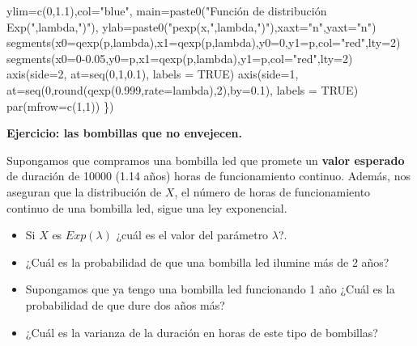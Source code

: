 \documentclass[
  letterpaper,
  DIV=11,
  numbers=noendperiod]{scrreprt}
\newenvironment{Shaded}{\begin{snugshade}}{\end{snugshade}}
\newcommand{\AttributeTok}[1]{\textcolor[rgb]{0.40,0.45,0.13}{#1}}
\newcommand{\ConstantTok}[1]{\textcolor[rgb]{0.56,0.35,0.01}{#1}}
\newcommand{\DecValTok}[1]{\textcolor[rgb]{0.68,0.00,0.00}{#1}}
\newcommand{\FloatTok}[1]{\textcolor[rgb]{0.68,0.00,0.00}{#1}}
\newcommand{\FunctionTok}[1]{\textcolor[rgb]{0.28,0.35,0.67}{#1}}
\newcommand{\NormalTok}[1]{\textcolor[rgb]{0.00,0.23,0.31}{#1}}
\newcommand{\StringTok}[1]{\textcolor[rgb]{0.13,0.47,0.30}{#1}}
\providecommand{\tightlist}{%
  \setlength{\itemsep}{0pt}\setlength{\parskip}{0pt}}\usepackage{longtable,booktabs,array}
\begin{document}
\begin{Shaded}
\begin{Highlighting}[]
        \AttributeTok{ylim=}\FunctionTok{c}\NormalTok{(}\DecValTok{0}\NormalTok{,}\FloatTok{1.1}\NormalTok{),}\AttributeTok{col=}\StringTok{"blue"}\NormalTok{,}
        \AttributeTok{main=}\FunctionTok{paste0}\NormalTok{(}\StringTok{"Función de distribución Exp("}\NormalTok{,lambda,}\StringTok{")"}\NormalTok{),}
        \AttributeTok{ylab=}\FunctionTok{paste0}\NormalTok{(}\StringTok{"pexp(x,"}\NormalTok{,lambda,}\StringTok{")"}\NormalTok{),}\AttributeTok{xaxt=}\StringTok{"n"}\NormalTok{,}\AttributeTok{yaxt=}\StringTok{"n"}\NormalTok{)}
  \FunctionTok{segments}\NormalTok{(}\AttributeTok{x0=}\FunctionTok{qexp}\NormalTok{(p,lambda),}\AttributeTok{x1=}\FunctionTok{qexp}\NormalTok{(p,lambda),}\AttributeTok{y0=}\DecValTok{0}\NormalTok{,}\AttributeTok{y1=}\NormalTok{p,}\AttributeTok{col=}\StringTok{"red"}\NormalTok{,}\AttributeTok{lty=}\DecValTok{2}\NormalTok{)}
  \FunctionTok{segments}\NormalTok{(}\AttributeTok{x0=}\DecValTok{0}\FloatTok{{-}0.05}\NormalTok{,}\AttributeTok{y0=}\NormalTok{p,}\AttributeTok{x1=}\FunctionTok{qexp}\NormalTok{(p,lambda),}\AttributeTok{y1=}\NormalTok{p,}\AttributeTok{col=}\StringTok{"red"}\NormalTok{,}\AttributeTok{lty=}\DecValTok{2}\NormalTok{)}
  \FunctionTok{axis}\NormalTok{(}\AttributeTok{side=}\DecValTok{2}\NormalTok{, }\AttributeTok{at=}\FunctionTok{seq}\NormalTok{(}\DecValTok{0}\NormalTok{,}\DecValTok{1}\NormalTok{,}\FloatTok{0.1}\NormalTok{), }\AttributeTok{labels =} \ConstantTok{TRUE}\NormalTok{)}
  \FunctionTok{axis}\NormalTok{(}\AttributeTok{side=}\DecValTok{1}\NormalTok{, }\AttributeTok{at=}\FunctionTok{seq}\NormalTok{(}\DecValTok{0}\NormalTok{,}\FunctionTok{round}\NormalTok{(}\FunctionTok{qexp}\NormalTok{(}\FloatTok{0.999}\NormalTok{,}\AttributeTok{rate=}\NormalTok{lambda),}\DecValTok{2}\NormalTok{),}\AttributeTok{by=}\FloatTok{0.1}\NormalTok{), }\AttributeTok{labels =} \ConstantTok{TRUE}\NormalTok{)}
  \FunctionTok{par}\NormalTok{(}\AttributeTok{mfrow=}\FunctionTok{c}\NormalTok{(}\DecValTok{1}\NormalTok{,}\DecValTok{1}\NormalTok{))}
\NormalTok{\})}
\end{Highlighting}
\end{Shaded}

\textbf{Ejercicio: las bombillas que no envejecen.}

Supongamos que compramos una bombilla led que promete un \textbf{valor
esperado} de duración de 10000 (1.14 años) horas de funcionamiento
continuo. Además, nos aseguran que la distribución de \(X\), el número
de horas de funcionamiento continuo de una bombilla led, sigue una ley
exponencial.

\begin{itemize}
\tightlist
\item
  Si \(X\) es \(Exp(\lambda)\) ¿cuál es el valor del parámetro
  \(\lambda\)?.
\item
  ¿Cuál es la probabilidad de que una bombilla led ilumine más de 2
  años?
\item
  Supongamos que ya tengo una bombilla led funcionando 1 año ¿Cuál es la
  probabilidad de que dure dos años más?
\item
  ¿Cuál es la varianza de la duración en horas de este tipo de
  bombillas?
\end{itemize}
\end{document}
